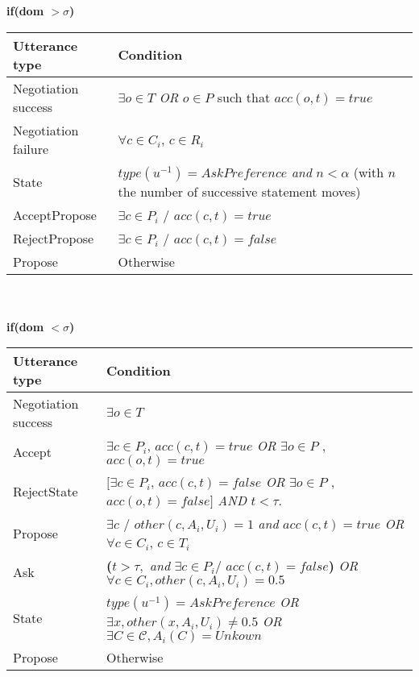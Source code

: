 \documentclass{article}
\begin{document}
	
	\textbf{if(\textbf{dom  $>\sigma$})} \\
	\begin{tabular}{|p{3cm}|p{9cm}|}
		\hline
		\textbf{Utterance type} & Condition \\
		\hline
		 Negotiation success & $\exists o \in T$   \emph{OR} $o \in P$ such that  $acc(o,t) = true$ \\
		\hline
		Negotiation failure & $ \forall c \in C_i$,  $c \in R_i$\\
		\hline
		State & $type(u^{-1}) = AskPreference$  \textit{ and }
		$n < \alpha$ (with $n$ the number of successive statement moves)\\
		\hline
		AcceptPropose & $\exists c \in P_i$ / $acc(c,t)= true$ \\
		\hline
		RejectPropose & $\exists c \in P_i$ / $acc(c,t)= false$ \\
		\hline
		Propose & Otherwise  \\
		
	\hline
	\end{tabular}
	\\ \\
		
	\textbf{if(\textbf{dom  $<\sigma$})} \\
	
	\begin{tabular}{|p{3cm}|p{9cm}|}
		\hline
		\textbf{Utterance type} & Condition \\
		\hline
		Negotiation success &  $\exists o \in T$ \\
		\hline
		Accept & $\exists c \in P_i$, $acc(c, t)=true $ \newline \emph{OR}   \newline $ \exists o \in P$ ,  $acc(o, t) =true$ \\
		\hline
		RejectState & $ [\exists c \in P_i$, $acc(c, t)= false $  \emph{OR}   $ \exists o \in P$ ,  $acc(o, t)=false]$ \newline  \emph{AND} $t<\tau$.\\
		\hline
		Propose & $\exists c$ / $other(c, A_i, U_i)  = 1 $  \emph{and}
		\newline $acc(c, t)=true$
		\newline \emph{OR}  
		\newline $\forall c \in C_i$,  $c \in T_i$\\
		\hline
		Ask &  \textbf{(}$t> \tau,$ \emph{and} 
		$\exists c \in P_i /$
		 $ acc(c, t)=false$\textbf{) }
		\newline \emph{OR}
		\newline $ \forall c \in C_i,other(c, A_i, U_i)=0.5$ \\
		\hline
		
		State & $type(u^{-1}) = AskPreference$
		\newline \emph{OR}
		\newline $\exists x,other(x, A_i, U_i) \not = 0.5 $ 
		\newline \emph{OR}
		\newline $ \exists C \in \mathcal{C}, A_i(C) = Unkown$
		\\
		\hline
			Propose & Otherwise \\
		\hline
	\end{tabular}
	
\end{document}
